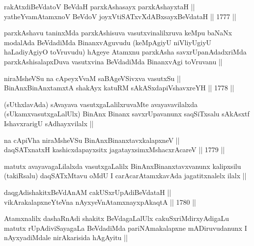 \begin{shl}
rakAtxdiBeVdatoV BeVdaH parxkAshasayx parxkAshayxtaH || \\
yatheYvamAtamxnoV BeVdoV joyxVtiSATxvXdABxsayxBeVdataH ||  1777 ||  
\end{shl}

\begin{artha}
parxkAshavu taninxMda parxkAshisuva vasutxvinalilxruva keMpu baNaNx
modalAda BeVdadiMda BinanxvAguvudu (keMpAgiyU niVliyUgiyU haLadiyAgiyO
toVruvudu) hAgeye Atamxnu parxkAsha savxrUpanAdadxriMda
parxkAshisalapxDuva vasutxvina BeVdadiMda BinanxvAgi toVruvanu ||
\end{artha}


\begin{shl}
niraMsheVSu na cApeyxVvaM saBAgeVSivxva vasutxSu || \\
BinAnxBinAnxtamxtA shakAyx katuRM sAkASxdapiVshavxreYH ||  1778 ||  
\end{shl}

\begin{artha}
(sUthxlavAda) sAvayava vasutxgaLalilxruvaMte avayavavilalxda
  (sUkamxvasutxgaLalUlx) BinAnx Binanx savxrUpavanunx saqSiTxsalu
  sAkAsxtf IshavxrarigU sAdhayxvilalx ||
\end{artha}

\begin{shl}
na cApiVha niraMsheVSu BinAnxBinanxtavxkalapxneV || \\
daqSATxnatxH kashicxdapayxsitx jagatayxsimxMshacxrAcareV ||  1779 ||  
\end{shl}

\begin{artha}
matutx avayavagaLilalxda vasutxgaLalilx BinAnxBinanxtavxvanunx
kalipxsilu (takiRsalu) daqSATxMtavu oMdU I carAcarAtamxkavAda
jagatitxnalelx ilalx ||
\end{artha}

\begin{shl}
daqgAdishakitxBeVdAnAM cakUSxrUpAdiBeVdataH || \\
vikArakalapxneYteVna nAyxyeVnA\s \s tamxnayxpAkaqtA ||  1780 || 
\end{shl}

\begin{artha}
Atamxnalilx dashaRnAdi shakitx BeVdagaLalUlx cakuSxriMdirxyAdigaLu
matutx rUpAdiviSayagaLa BeVdadiMda pariNAmakalapxne mADiruvudanunx I
nAyxyadiMdale nirAkarisida hAgAyitu ||
\end{artha}

